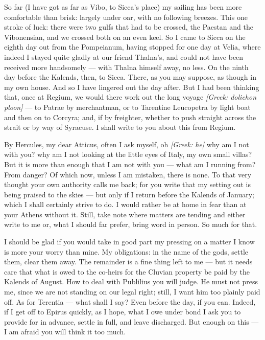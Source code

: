 

 So far (I have got as far as Vibo, to Sicca's place) my sailing has been more comfortable than brisk: largely under oar, with no following breezes. This one stroke of luck: there were two gulfs that had to be crossed, the Paestan and the Vibonensian, and we crossed both on an even keel. So I came to Sicca on the eighth day out from the Pompeianum, having stopped for one day at Velia, where indeed I stayed quite gladly at our friend Thalna's, and could not have been received more handsomely --- with Thalna himself away, no less. On the ninth day before the Kalends, then, to Sicca. There, as you may suppose, as though in my own house. And so I have lingered out the day after. But I had been thinking that, once at Regium, we would there work out the long voyage \textit{[Greek: dolichon ploon]} --- to Patrae by merchantman, or to Tarentine Leucopetra by light boat and then on to Corcyra; and, if by freighter, whether to push straight across the strait or by way of Syracuse. I shall write to you about this from Regium.

 By Hercules, my dear Atticus, often I ask myself, oh \textit{[Greek: he]} why am I not with you? why am I not looking at the little eyes of Italy, my own small villas? But it is more than enough that I am not with you --- what am I running from? From danger? Of which now, unless I am mistaken, there is none. To that very thought your own authority calls me back; for you write that my setting out is being praised to the skies --- but only if I return before the Kalends of January; which I shall certainly strive to do. I would rather be at home in fear than at your Athens without it. Still, take note where matters are tending and either write to me or, what I should far prefer, bring word in person. So much for that.

 I should be glad if you would take in good part my pressing on a matter I know is more your worry than mine. My obligations: in the name of the gods, settle them, clear them away. The remainder is a fine thing left to me --- but it needs care that what is owed to the co-heirs for the Cluvian property be paid by the Kalends of August. How to deal with Publilius you will judge. He must not press me, since we are not standing on our legal right; still, I want him too plainly paid off. As for Terentia --- what shall I say? Even before the day, if you can. Indeed, if I get off to Epirus quickly, as I hope, what I owe under bond I ask you to provide for in advance, settle in full, and leave discharged. But enough on this --- I am afraid you will think it too much.

